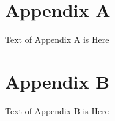 \newpage
\appendix
\section*{Appendix A} \label{App:AppendixA}

Text of Appendix A is Here

\newpage
\section*{Appendix B} \label{App:AppendixB}

Text of Appendix B is Here